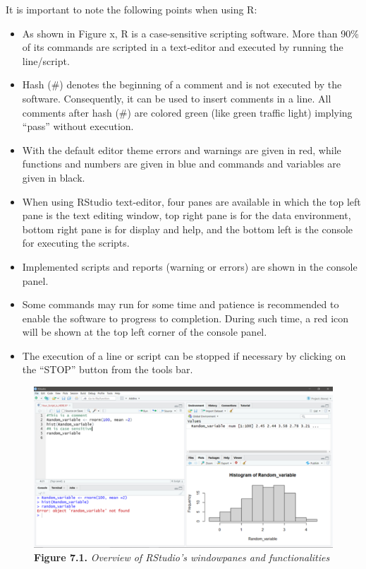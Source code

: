 \documentclass[
  10pt,
  b5paper,
]{book}
\providecommand{\tightlist}{%
  \setlength{\itemsep}{0pt}\setlength{\parskip}{0pt}}
\begin{document}
It is important to note the following points when using R:

\begin{itemize}
\tightlist
\item
  As shown in Figure x, R is a case-sensitive scripting software. More than 90\% of its commands are scripted in a text-editor and executed by running the line/script.
\item
  Hash (\#) denotes the beginning of a comment and is not executed by the software. Consequently, it can be used to insert comments in a line. All comments after hash (\#) are colored green (like green traffic light) implying ``pass'' without execution.
\item
  With the default editor theme errors and warnings are given in red, while functions and numbers are given in blue and commands and variables are given in black.
\item
  When using RStudio text-editor, four panes are available in which the top left pane is the text editing window, top right pane is for the data environment, bottom right pane is for display and help, and the bottom left is the console for executing the scripts.
\item
  Implemented scripts and reports (warning or errors) are shown in the console panel.
\item
  Some commands may run for some time and patience is recommended to enable the software to progress to completion. During such time, a red icon will be shown at the top left corner of the console panel.
\item
  The execution of a line or script can be stopped if necessary by clicking on the ``STOP'' button from the tools bar.
\end{itemize}

\begin{figure}
\centering
\includegraphics{images/Figure_7.1.png}
\caption{\textbf{Figure 7.1.} \emph{Overview of RStudio's windowpanes and functionalities}}
\end{figure}
\end{document}
